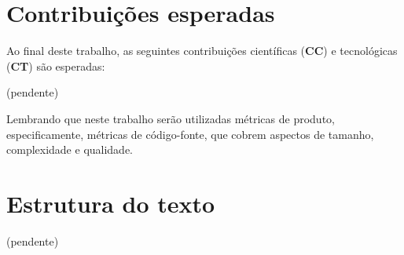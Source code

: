 \section{Contribuições esperadas}

Ao final deste trabalho, as seguintes contribuições científicas ({\bf CC}) e
tecnológicas ({\bf CT}) são esperadas:

(pendente)


Lembrando que neste trabalho serão utilizadas métricas de produto,
especificamente, métricas de código-fonte, que cobrem aspectos de tamanho,
complexidade e qualidade.

\section{Estrutura do texto} 

(pendente)



